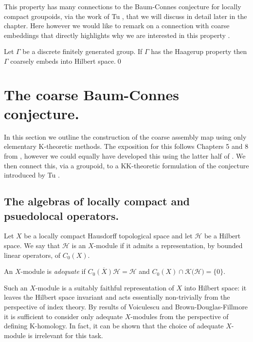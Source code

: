 This property has many connections to the Baum-Connes conjecture for locally compact groupoids, via the work of Tu \cite{MR1703305,MR1798599,cbcag2}, that we will discuss in detail later in the chapter. Here however we would like to remark on a connection with coarse embeddings that directly highlights why we are interested in this property \cite{MR1852148}.

\begin{proposition}
Let $\Gamma$ be a discrete finitely generated group. If $\Gamma$ has the Haagerup property then $\Gamma$ coarsely embeds into Hilbert space.\qed
\end{proposition}

\section{The coarse Baum-Connes conjecture.}

In this section we outline the construction of the coarse assembly map using only elementary K-theoretic methods. The exposition for this follows Chapters 5 and 8 from \cite{MR1399087}, however we could equally have developed this using the latter half of \cite{MR1817560,MR1388312}. We then connect this, via a groupoid, to a KK-theoretic formulation of the conjecture introduced by Tu \cite{MR1703305,MR1798599}.

\subsection{The algebras of locally compact and psuedolocal operators.}
Let $X$ be a locally compact Hausdorff topological space and let $\mathcal{H}$ be a Hilbert space. We say that $\mathcal{H}$ is an $X$-module if it admits a representation, by bounded linear operators, of $C_{0}(X)$. 

\begin{definition}
An $X$-module is \textit{adequate} if $\overline{C_{0}(X)\mathcal{H}}=\mathcal{H}$ and $C_{0}(X)\cap \mathcal{K(\mathcal{H}})= \lbrace 0 \rbrace$.
\end{definition}

\begin{remark}
Such an $X$-module is a suitably faithful representation of $X$ into Hilbert space: it leaves the Hilbert space invariant and acts essentially non-trivially from the perspective of index theory. By results of Voiculescu \cite{MR0415338} and Brown-Douglas-Fillmore \cite{MR0458196} it is sufficient to consider only adequate $X$-modules from the perspective of defining K-homology. In fact, it can be shown that the choice of adequate $X$-module is irrelevant for this task.
\end{remark}

